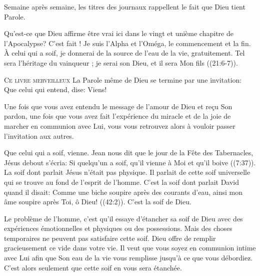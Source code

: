 Semaine après semaine, les titres des journaux rappellent le fait
 que Dieu tient Parole. 

Qu'est-ce que Dieu affirme être vrai ici dans le vingt et unième chapitre
 de l'Apocalypse?
 \Og C'est fait ! Je suis l'Alpha et l'Oméga, le commencement et la fin.
 À celui qui a soif, je donnerai de la source de l'eau de la vie,
 gratuitement. Tel sera l'héritage du vainqueur ;
 je serai son Dieu, et il sera Mon fils \Fg{} ((21:6-7)).

\dvrule






\lettrine{C}{e livre merveilleux}
 \ocadr La Parole même de Dieu \fcadr{}
 se termine par une invitation: 
 \Og Que celui qui entend, dise: 
 \Og Viens! \Fg{} 

Une fois que vous avez entendu le message de l'amour de Dieu
 et re\c{c}u Son pardon, une fois que vous avez fait l'expérience
 du miracle et de la joie de marcher en communion avec Lui,
 vous vous retrouvez alors à vouloir passer l'invitation aux autres. 

\Og Que celui qui a soif, vienne. \Fg{}
 Jean nous dit que le jour de la Fête des Tabernacles,
 Jésus debout s'écria:
 \Og Si quelqu'un a soif, qu'il vienne à Moi et qu'il boive \Fg{}
 ((7:37)).
 La soif dont parlait Jésus n'était pas physique.
 Il parlait de cette soif universelle qui se trouve au fond
 de l'esprit de l'homme. C'est la soif dont parlait David
 quand il disait: 
 \Og Comme une biche soupire après des courants d'eau,
 ainsi mon âme soupire après Toi, ô Dieu! \Fg{} ((42:2)).
 C'est la soif de Dieu. 

Le problème de l'homme, c'est qu'il essaye d'étancher sa soif de Dieu
 avec des expériences émotionnelles et physiques ou des possessions.
 Mais des choses temporaires ne peuvent pas satisfaire cette soif.
 Dieu offre de remplir gracieusement ce vide dans votre vie.
 Il veut que vous soyez en communion intime avec Lui
 afin que Son eau de la vie vous remplisse jusqu'à ce que vous débordiez.
 C'est alors seulement que cette soif en vous sera étanchée. 

